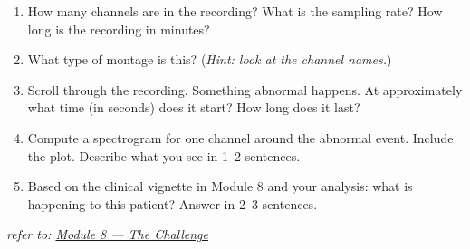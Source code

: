 \documentclass[11pt,letterpaper]{article}
\begin{document}
\begin{enumerate}[label=(\alph*),leftmargin=*]
\item How many channels are in the recording? What is the sampling rate? How long is the recording in minutes?
\item What type of montage is this? (\textit{Hint: look at the channel names.})
\item Scroll through the recording. Something abnormal happens. At approximately what time (in seconds) does it start? How long does it last?
\item Compute a spectrogram for one channel around the abnormal event. Include the plot. Describe what you see in 1--2 sentences.
\item Based on the clinical vignette in Module 8 and your analysis: what is happening to this patient? Answer in 2--3 sentences.
\end{enumerate}

\vspace{5cm}
\hfill\textit{\small refer to: \href{https://judepj.github.io/neuro-signals-101/modules/08_challenge.html}{Module 8 — The Challenge}}
\end{document}
